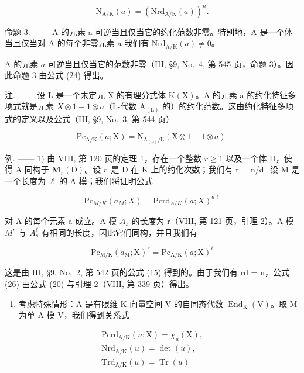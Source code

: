 \[
\mathrm{N} _ {\mathrm{A/K}} (a) = (\mathrm{Nrd} _ {\mathrm{A/K}} (a)) ^ {n}.\tag{24}
\]

命题 3. —— A 的元素 a 可逆当且仅当它的约化范数非零。特别地，A 是一个体当且仅当对 A 的每个非零元素 a 我们有 \(\mathrm{Nrd}_{\mathrm{A}/\mathrm{K}}(a) \neq 0\)。

A 的元素 \(a\) 可逆当且仅当它的范数非零（III, §9, No.~4, 第 545 页，命题 3）。因此命题 3 由公式 (24) 得出。

注. —— 设 L 是一个未定元 X 的有理分式体 \(\mathrm{K}(\mathrm{X})\)。A 的元素 a 的约化特征多项式就是元素 \(X \otimes 1 - 1 \otimes a\)（L-代数 \(\mathrm{A}_{(\mathrm{L})}\) 的）的约化范数。这由约化特征多项式的定义以及公式（III, §9, No.~3, 第 544 页）

\[
\mathrm{Pc} _ {\mathrm{A/K}} (a; \mathrm{X}) = \mathrm{N} _ {\mathrm{A} _ {(\mathrm{L})} / \mathrm{L}} (\mathrm{X} \otimes 1 - 1 \otimes a).\tag{25}
\]

例. —— 1) 由 VIII, 第 120 页的定理 1，存在一个整数 \(r \geqslant 1\) 以及一个体 D，使得 A 同构于 \(\mathbf{M}_{r}(\mathrm{D})\)。设 d 是 D 在 K 上的约化次数；我们有 r = n/d.~设 M 是一个长度为 \(\ell\) 的 A-模；我们将证明公式

\[
\mathrm{Pc} _ {M / K} (a_ {M} ;X) = \mathrm{Pcrd} _ {A / K} (a; X) ^ {d\ell}\tag{26}
\]

对 A 的每个元素 a 成立。A-模 \(A_{s}\) 的长度为 r（VIII, 第 121 页，引理 2）。A-模 \(M^{r}\) 与 \(A_{s}^{\ell}\) 有相同的长度，因此它们同构，并且我们有

\[
\mathrm{Pc} _ {\mathrm{M/K}} (a _ {\mathrm{M}}; \mathrm{X}) ^ {r} = \mathrm{Pc} _ {\mathrm{A/K}} (a; \mathrm{X}) ^ {\ell}
\]

这是由 III, §9, No.~2, 第 542 页的公式 (15) 得到的。由于我们有 rd = n，公式 (26) 由公式 (20) 与引理 2（VIII, 第 339 页）得出。

\begin{enumerate}
\def\labelenumi{\arabic{enumi})}
\setcounter{enumi}{1}
\tightlist
\item
  考虑特殊情形：A 是有限维 K-向量空间 V 的自同态代数 \(\operatorname{End}_{\mathrm{K}}(\mathrm{V})\)。取 M 为单 A-模 V，我们得到关系式
\end{enumerate}

\[
\begin{array}{c} \mathrm{Pcrd} _ {\mathrm{A/K}} (u; \mathrm{X}) = \chi_ {u} (\mathrm{X}), \\ \mathrm{Nrd} _ {\mathrm{A/K}} (u) = \det (u), \\ \mathrm{Trd} _ {\mathrm{A/K}} (u) = \operatorname{Tr} (u) \end{array}\tag{27}
\]

